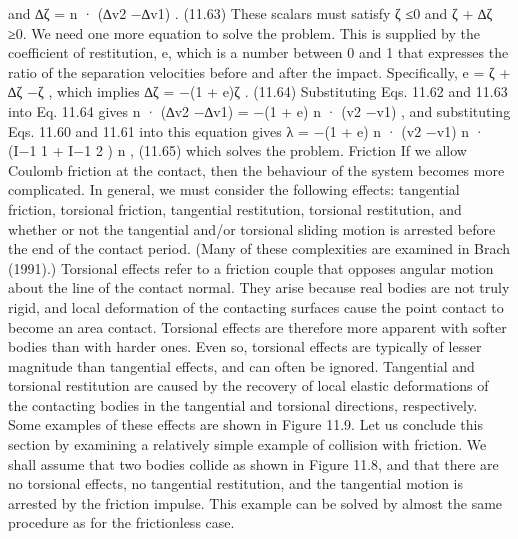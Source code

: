and ∆ζ = n · (∆v2 −∆v1) . (11.63) These scalars must satisfy ζ ≤0 and ζ + ∆ζ ≥0. We need one more equation to solve the problem. This is supplied by the coefficient of restitution, e, which is a number between 0 and 1 that expresses the ratio of the separation velocities before and after the impact. Specifically, e = ζ + ∆ζ −ζ , which implies ∆ζ = −(1 + e)ζ . (11.64) Substituting Eqs. 11.62 and 11.63 into Eq. 11.64 gives n · (∆v2 −∆v1) = −(1 + e) n · (v2 −v1) , and substituting Eqs. 11.60 and 11.61 into this equation gives λ = −(1 + e) n · (v2 −v1) n · (I−1 1 + I−1 2 ) n , (11.65) which solves the problem. Friction If we allow Coulomb friction at the contact, then the behaviour of the system becomes more complicated. In general, we must consider the following effects: tangential friction, torsional friction, tangential restitution, torsional restitution, and whether or not the tangential and/or torsional sliding motion is arrested before the end of the contact period. (Many of these complexities are examined in Brach (1991).) Torsional effects refer to a friction couple that opposes angular motion about the line of the contact normal. They arise because real bodies are not truly rigid, and local deformation of the contacting surfaces cause the point contact to become an area contact. Torsional effects are therefore more apparent with softer bodies than with harder ones. Even so, torsional effects are typically of lesser magnitude than tangential effects, and can often be ignored. Tangential and torsional restitution are caused by the recovery of local elastic deformations of the contacting bodies in the tangential and torsional directions, respectively. Some examples of these effects are shown in Figure 11.9. Let us conclude this section by examining a relatively simple example of collision with friction. We shall assume that two bodies collide as shown in Figure 11.8, and that there are no torsional effects, no tangential restitution, and the tangential motion is arrested by the friction impulse. This example can be solved by almost the same procedure as for the frictionless case.

